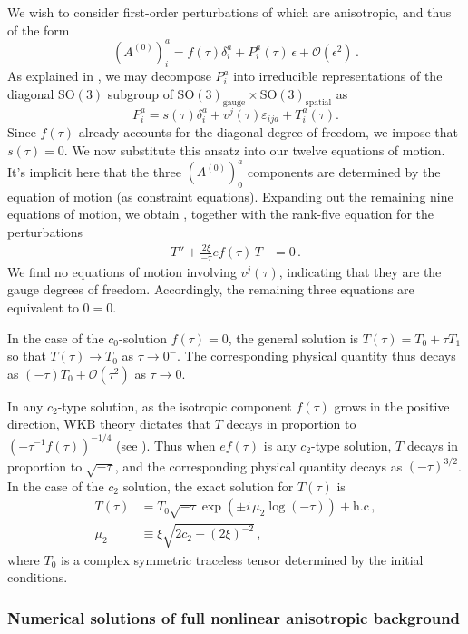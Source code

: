 We wish to consider first-order perturbations of  which are anisotropic, and thus of the form 
\[
(A^{(0)})_{i}^{a}=f(\tau)\delta_{i}^{a}+P_{i}^{a}(\tau)\,\epsilon+\mathcal{O}(\epsilon^{2})\,.
\]
 As explained in , we may decompose $P_{i}^{a}$ into irreducible representations of the diagonal $\mathrm{SO}(3)$ subgroup of $\mathrm{SO}(3)_{\mathrm{gauge}}\times\mathrm{SO}(3)_{\mathrm{spatial}}$ as 
\[
P_{i}^{a}=s(\tau)\delta_{i}^{a}+v^{j}(\tau)\varepsilon_{ija}+T_{i}^{a}(\tau).
\]
 Since $f(\tau)$ already accounts for the diagonal degree of freedom, we impose that $s(\tau)=0$. We now substitute this ansatz into our twelve equations of motion. It's implicit here that the three $(A^{(0)})_{0}^{a}$ components are determined by the equation of motion (as constraint equations). Expanding out the remaining nine equations of motion, we obtain , together with the rank-five equation for the perturbations 
\begin{align*}
T''+\frac{2\xi}{-\tau}ef(\tau)\,T & =0\,.
\end{align*}
We find no equations of motion involving $v^{j}(\tau)$, indicating that they are the gauge degrees of freedom. Accordingly, the remaining three equations are equivalent to $0=0$.

In the case of the $c_{0}$-solution $f(\tau)=0$, the general solution is $T(\tau)=T_{0}+\tau T_{1}$ so that $T(\tau)\to T_{0}$ as $\tau\to0^{-}$. The corresponding physical quantity thus decays as $(-\tau)T_{0}+\mathcal{O}(\tau^{2})$ as $\tau\to0$. 

In any $c_{2}$\nobreakdash-type solution, as the isotropic component $f(\tau)$ grows in the positive direction, WKB theory dictates that $T$ decays in proportion to $\left(-\tau^{-1}f(\tau)\right)^{-1/4}$ (see ). Thus when $ef(\tau)$ is any $c_{2}$\nobreakdash-type solution, $T$ decays in proportion to $\sqrt{-\tau}$, and the corresponding physical quantity decays as $(-\tau)^{3/2}$. In the case of the $c_{2}$ solution, the exact solution for $T(\tau)$ is 
\begin{align*}
T(\tau) & =T_{0}\sqrt{-\tau}\exp\left(\pm i\,\mu_{2}\log(-\tau)\right)+\textrm{h.c}\,,\\
\mu_{2} & \equiv\xi\sqrt{2c_{2}-(2\xi)^{-2}}\,,
\end{align*}
where $T_{0}$ is a complex symmetric traceless tensor determined by the initial conditions.

\subsubsection*{Numerical solutions of full nonlinear anisotropic background}

